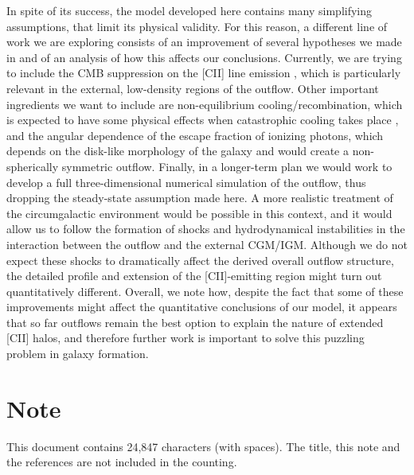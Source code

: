 \documentclass[12pt]{article}
\begin{document}
In spite of its success, the model developed here contains many simplifying assumptions, that limit its physical validity. For this reason, a different line of work we are exploring consists of an improvement of several hypotheses we made in \citet{Pizzati20} and of an analysis of how this affects our conclusions. 
Currently, we are trying to include the CMB suppression on the [CII] line emission \citep{dacunha2013, pallottini2017b, kohandel:2019}, which is particularly relevant in the external, low-density regions of the outflow.
Other important ingredients we want to include are non-equilibrium cooling/recombination, which is expected to have some physical effects when catastrophic cooling takes place \citep{gray2019catastrophic}, and the angular dependence of the escape fraction of ionizing photons, which depends on the disk-like morphology of the galaxy and would create a non-spherically symmetric outflow. 
Finally, in a longer-term plan we would work to develop a full three-dimensional numerical simulation of the outflow, thus dropping the steady-state assumption made here. A more realistic treatment of the circumgalactic environment would be possible in this context, and it would allow us to follow the formation of shocks and hydrodynamical instabilities in the interaction between the outflow and the external CGM/IGM. Although we do not expect these shocks to dramatically affect the derived overall outflow structure, the detailed profile and
extension of the [CII]-emitting region might turn out quantitatively different. Overall, we note how, despite the fact that some of these improvements might affect the quantitative conclusions of our model, it appears that so far outflows remain the best option to explain the nature of extended [CII] halos, and therefore further work is important to solve this puzzling problem in galaxy formation.


\section*{Note}

This document contains 24,847 characters (with spaces). The title, this note and the references are not included in the counting.



\end{document}
